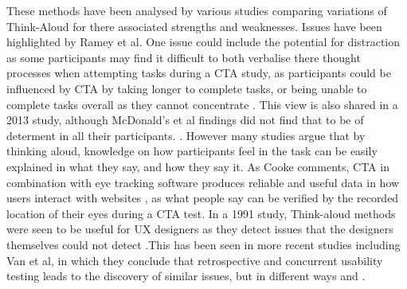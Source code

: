 These methods have been analysed by various studies comparing variations of Think-Aloud for there associated strengths and weaknesses. Issues have been highlighted by Ramey et al. One issue could include the potential for distraction as some participants may find it difficult to both verbalise there thought processes when attempting tasks during a CTA study, as participants could be influenced by CTA by taking longer to complete tasks, or being unable to complete tasks overall as they cannot concentrate \citep{ramey2006does}. This view is also shared in a 2013 study, although McDonald's et al findings did not find that to be of determent in all their participants. \citep{mcdonald2013thinking}. However many studies argue that by thinking aloud, knowledge on how participants feel in the task can be easily explained in what they say, and how they say it. As Cooke comments, CTA in combination with eye tracking software produces reliable and useful data in how users interact with websites \citep{cooke2010assessing}, as what people say can be verified by the recorded location of their eyes during a CTA test. In a 1991 study, Think-aloud methods were seen to be useful for UX designers as they detect issues that the designers themselves could not detect \citep{wright1991cost}.This has been seen in more recent studies including Van et al, in which they conclude that retrospective and concurrent usability testing leads to the discovery of similar issues, but in different ways \citep{van2000thinking} and \citep{van2003retrospective}. 


